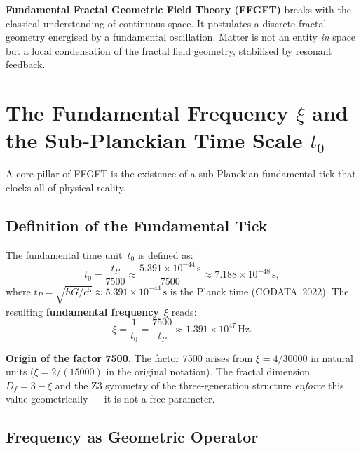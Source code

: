 \textbf{Fundamental Fractal Geometric Field Theory (FFGFT)} breaks with
the classical understanding of continuous space. It postulates a discrete
fractal geometry energised by a fundamental oscillation. Matter is not
an entity \emph{in} space but a local condensation of the fractal field
geometry, stabilised by resonant feedback.

\section{The Fundamental Frequency $\xi$ and the Sub-Planckian Time Scale $t_0$}

A core pillar of FFGFT is the existence of a sub-Planckian fundamental
tick that clocks all of physical reality.

\subsection{Definition of the Fundamental Tick}

The fundamental time unit~$t_0$ is defined as:
\begin{equation}
  t_0 = \frac{t_P}{7500}
      \approx \frac{5.391 \times 10^{-44}\,\text{s}}{7500}
      \approx 7.188 \times 10^{-48}\,\text{s},
  \label{eq:t0}
\end{equation}
where $t_P = \sqrt{\hbar G/c^5} \approx 5.391 \times 10^{-44}\,\text{s}$
is the Planck time (CODATA~2022). The resulting \textbf{fundamental
frequency}~$\xi$ reads:
\begin{equation}
  \xi = \frac{1}{t_0} = \frac{7500}{t_P}
      \approx 1.391 \times 10^{47}\,\text{Hz}.
  \label{eq:xi}
\end{equation}

\begin{keybox}
\textbf{Origin of the factor 7500.}\;
The factor 7500 arises from $\xi = 4/30000$ in natural units
($\xi = 2/(15000)$ in the original notation). The fractal dimension
$D_f = 3 - \xi$ and the Z3 symmetry of the three-generation structure
\emph{enforce} this value geometrically — it is not a free parameter.
\end{keybox}

\subsection{Frequency as Geometric Operator}

